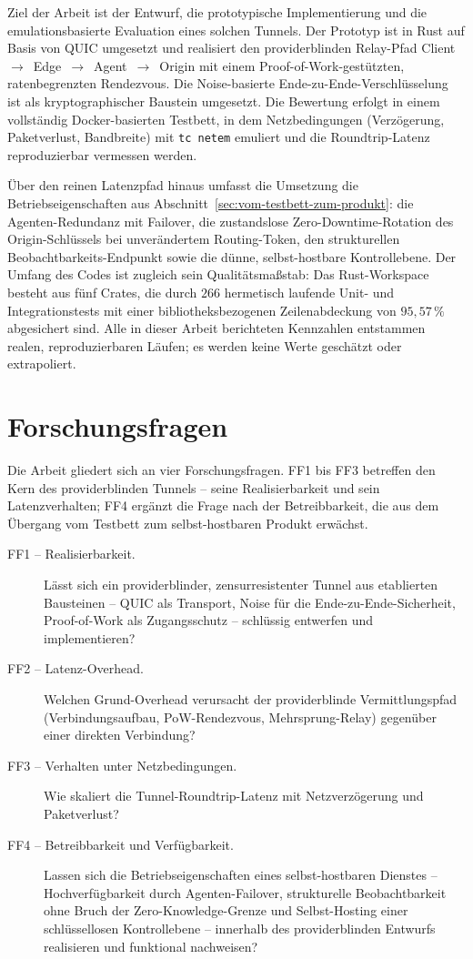 Ziel der Arbeit ist der Entwurf, die prototypische Implementierung und die
emulationsbasierte Evaluation eines solchen Tunnels. Der Prototyp ist in Rust auf
Basis von QUIC umgesetzt und realisiert den providerblinden Relay-Pfad
Client~$\rightarrow$~Edge~$\rightarrow$~Agent~$\rightarrow$~Origin mit einem
Proof-of-Work-gestützten, ratenbegrenzten Rendezvous. Die Noise-basierte
Ende-zu-Ende-Verschlüsselung ist als kryptographischer Baustein umgesetzt. Die
Bewertung erfolgt in einem vollständig Docker-basierten Testbett, in dem
Netzbedingungen (Verzögerung, Paketverlust, Bandbreite) mit \texttt{tc netem}
emuliert und die Roundtrip-Latenz reproduzierbar vermessen werden.

Über den reinen Latenzpfad hinaus umfasst die Umsetzung die Betriebseigenschaften
aus Abschnitt~\ref{sec:vom-testbett-zum-produkt}: die Agenten-Redundanz mit
Failover, die zustandslose Zero-Downtime-Rotation des Origin-Schlüssels bei
unverändertem Routing-Token, den strukturellen Beobachtbarkeits-Endpunkt sowie
die dünne, selbst-hostbare Kontrollebene. Der Umfang des Codes ist zugleich sein
Qualitätsmaßstab: Das Rust-Workspace besteht aus fünf Crates, die durch $266$
hermetisch laufende Unit- und Integrationstests mit einer bibliotheksbezogenen
Zeilenabdeckung von $95{,}57\,\%$ abgesichert sind. Alle in dieser Arbeit
berichteten Kennzahlen entstammen realen, reproduzierbaren Läufen; es werden
keine Werte geschätzt oder extrapoliert.

\section{Forschungsfragen}
\label{sec:forschungsfragen}

Die Arbeit gliedert sich an vier Forschungsfragen. FF1 bis FF3 betreffen den
Kern des providerblinden Tunnels -- seine Realisierbarkeit und sein
Latenzverhalten; FF4 ergänzt die Frage nach der Betreibbarkeit, die aus dem
Übergang vom Testbett zum selbst-hostbaren Produkt erwächst.

\begin{description}
  \item[FF1 -- Realisierbarkeit.] Lässt sich ein providerblinder,
    zensurresistenter Tunnel aus etablierten Bausteinen -- QUIC als Transport,
    Noise für die Ende-zu-Ende-Sicherheit, Proof-of-Work als Zugangsschutz --
    schlüssig entwerfen und implementieren?
  \item[FF2 -- Latenz-Overhead.] Welchen Grund-Overhead verursacht der
    providerblinde Vermittlungspfad (Verbindungsaufbau, PoW-Rendezvous,
    Mehrsprung-Relay) gegenüber einer direkten Verbindung?
  \item[FF3 -- Verhalten unter Netzbedingungen.] Wie skaliert die
    Tunnel-Roundtrip-Latenz mit Netzverzögerung und Paketverlust?
  \item[FF4 -- Betreibbarkeit und Verfügbarkeit.] Lassen sich die
    Betriebseigenschaften eines selbst-hostbaren Dienstes -- Hochverfügbarkeit
    durch Agenten-Failover, strukturelle Beobachtbarkeit ohne Bruch der
    Zero-Knowledge-Grenze und Selbst-Hosting einer schlüssellosen Kontrollebene
    -- innerhalb des providerblinden Entwurfs realisieren und funktional
    nachweisen?
\end{description}


